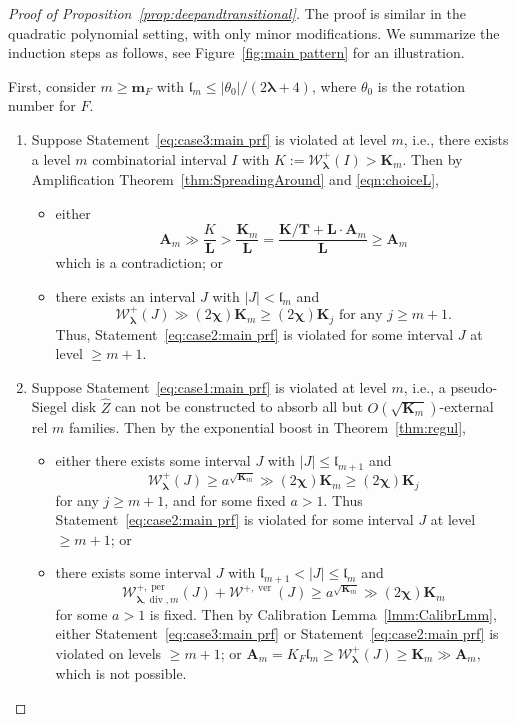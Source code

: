 \documentclass{amsart}
\newcommand{\1}{{\mathbb 1 }}
\newcommand{\blambda}{{\boldsymbol\lambda}}
\renewcommand{\div}{{\operatorname{div}}}
\newcommand{\Width}{{\mathcal W}}
\newcommand{\bA}{{\mathbf{A}}}
\newcommand{\wZ}{{\widehat Z}}
\newcommand{\bL}{{\mathbf L}}
\newcommand{\bT}{{\mathbf T}}
\newcommand{\bK}{{\mathbf K}}
\newcommand{\bbm}{{\mathbf m}}
\newcommand{\length}{{\mathfrak l}}
\newcommand\ver{{\operatorname{ver}}}
\newcommand\per{{\operatorname{per}}}
\theoremstyle{remark}
\numberwithin{equation}{section}
\theoremstyle{definition}
\newcommand{\bchi}{{\boldsymbol{ \chi}}}
\begin{document}
\begin{proof}[Proof of Proposition~\ref{prop:deepandtransitional}]
The proof is similar in the quadratic polynomial setting, with only minor modifications. We summarize the induction steps as follows, see Figure~\ref{fig:main pattern} for an illustration.

First, consider $m \geq \bbm_F$ with $\length_m \leq |\theta_0|/(2\blambda + 4)$, where $\theta_0$ is the rotation number for $F$.
\begin{enumerate}[label=\text{(\roman*)},font=\normalfont,leftmargin=*]
\item Suppose Statement~\ref{eq:case3:main prf} is violated at level $m$, i.e., there exists a level $m$ combinatorial interval $I$ with $K :=\Width^+_{\blambda}(I) > \bK_m$. Then by Amplification Theorem~\ref{thm:SpreadingAround} and \eqref{eqn:choiceL},
\begin{itemize}
    \item either 
    \begin{equation}\label{eq:bLvsbA}
    \bA_m \gg \frac{K}{\bL} > \frac{\bK_m}{\bL} =  \frac{\bK/\bT + \bL \cdot \bA_m}{\bL} \geq \bA_m    
    \end{equation}
     which is a contradiction; or
    \item there exists an interval $J$ with $|J| < \length_m$ and 
    $$
    \Width^+_{\blambda}(J) \gg (2\bchi)\bK_m \geq (2\bchi)\bK_{j} \text{ for any } j \geq m+1.
    $$
    Thus, Statement~\ref{eq:case2:main prf} is violated for some interval $J$ at level $\ge m+1$.
\end{itemize} 


\item Suppose Statement~\ref{eq:case1:main prf} is violated at level $m$, i.e., a pseudo-Siegel disk $\wZ$ can not be constructed to absorb all but $O(\sqrt{\bK_m})$-external rel $m$ families. Then by the exponential boost in Theorem~\ref{thm:regul}, 
\begin{itemize}
    \item either there exists some interval $J$ with $|J| \leq \length_{m+1}$ and 
    $$
    \Width^+_{\blambda}(J) \geq a^{\sqrt{\bK_m}} \gg (2\bchi)\bK_m \geq (2\bchi)\bK_{j}
    $$ 
    for any $j \geq m+1$, and for some fixed $a>1$. Thus Statement~\ref{eq:case2:main prf} is violated for some interval $J$ at level $\ge m+1$; or
    \item there exists some interval $J$ with $\length_{m+1} < |J| \leq \length_{m}$ and 
    $$
    \Width^{+,\per}_{\blambda, \div, m}(J) + \Width^{+, \ver}(J) \geq a^{\sqrt{\bK_m}} \gg (2\bchi)\bK_m
    $$
    for some $a>1$ is fixed.  Then by Calibration Lemma~\ref{lmm:CalibrLmm}, either Statement~\ref{eq:case3:main prf} or Statement~\ref{eq:case2:main prf}  is violated on levels $\ge m+1$; or $\bA_m = K_F \length_m \geq \Width^+_\blambda(J) \geq \bK_m \gg \bA_m$, which is not possible.
\end{itemize}




\end{enumerate}
\end{proof}
\end{document}
